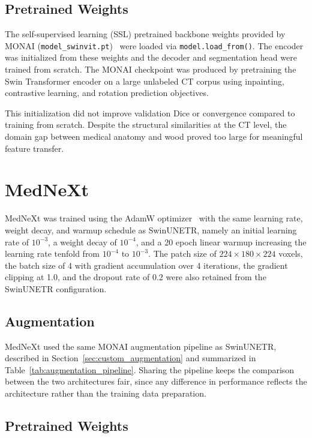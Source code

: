 \subsection{Pretrained Weights}
\label{sec:pretrained_weights}

The self-supervised learning (SSL) pretrained backbone weights provided by MONAI (\texttt{model\_swinvit.pt})~\cite{tang2022swinunetrssl} were loaded via \texttt{model.load\_from()}. The encoder was initialized from these weights and the decoder and segmentation head were trained from scratch. The MONAI checkpoint was produced by pretraining the Swin Transformer encoder on a large unlabeled CT corpus using inpainting, contrastive learning, and rotation prediction objectives.

This initialization did not improve validation Dice or convergence compared to training from scratch. Despite the structural similarities at the CT level, the domain gap between medical anatomy and wood proved too large for meaningful feature transfer.

\section{MedNeXt}

MedNeXt was trained using the AdamW optimizer~\cite{loshchilov2019adamw} with the same learning rate, weight decay, and warmup schedule as SwinUNETR, namely an initial learning rate of $10^{-3}$, a weight decay of $10^{-4}$, and a 20 epoch linear warmup increasing the learning rate tenfold from $10^{-4}$ to $10^{-3}$. The patch size of $224 \times 180 \times 224$ voxels, the batch size of 4 with gradient accumulation over 4 iterations, the gradient clipping at 1.0, and the dropout rate of 0.2 were also retained from the SwinUNETR configuration.

\subsection{Augmentation}

MedNeXt used the same MONAI augmentation pipeline as SwinUNETR, described in Section~\ref{sec:custom_augmentation} and summarized in Table~\ref{tab:augmentation_pipeline}. Sharing the pipeline keeps the comparison between the two architectures fair, since any difference in performance reflects the architecture rather than the training data preparation.

\subsection{Pretrained Weights}

